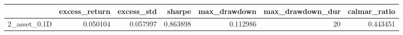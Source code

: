 \begin{tabular}{lrrrrrr}
\toprule
{} &  excess\_return &  excess\_std &    sharpe &  max\_drawdown &  max\_drawdown\_dur &  calmar\_ratio \\
\midrule
2\_asset\_0.1D &       0.050104 &    0.057997 &  0.863898 &      0.112986 &                20 &      0.443451 \\
\bottomrule
\end{tabular}
